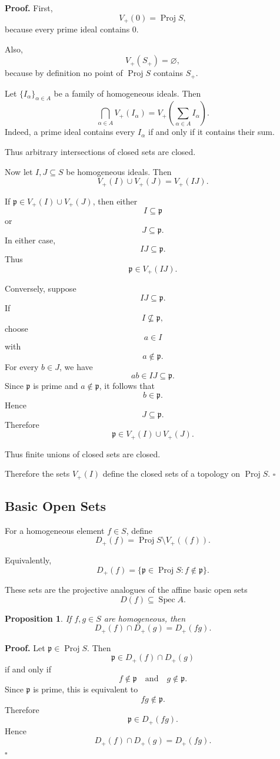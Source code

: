 \documentclass[12pt,a4paper]{article}
\DeclareMathOperator{\Spec}{Spec}
\DeclareMathOperator{\Proj}{Proj}
\newtheorem{proposition}[theorem]{Proposition}
\theoremstyle{notespace}
\begin{document}
\textbf{Proof.}
First,
\[
V_+(0)=\Proj S,
\]
because every prime ideal contains \(0\).

Also,
\[
V_+(S_+)=\varnothing,
\]
because by definition no point of \(\Proj S\) contains \(S_+\).

Let \(\{I_\alpha\}_{\alpha\in A}\) be a family of homogeneous ideals. Then
\[
\bigcap_{\alpha\in A}V_+(I_\alpha)
=
V_+\left(\sum_{\alpha\in A}I_\alpha\right).
\]
Indeed, a prime ideal contains every \(I_\alpha\) if and only if it contains their sum.

Thus arbitrary intersections of closed sets are closed.

Now let \(I,J\subseteq S\) be homogeneous ideals. Then
\[
V_+(I)\cup V_+(J)=V_+(IJ).
\]

If \(\mathfrak p\in V_+(I)\cup V_+(J)\), then either
\[
I\subseteq \mathfrak p
\]
or
\[
J\subseteq \mathfrak p.
\]
In either case,
\[
IJ\subseteq \mathfrak p.
\]
Thus
\[
\mathfrak p\in V_+(IJ).
\]

Conversely, suppose
\[
IJ\subseteq \mathfrak p.
\]
If
\[
I\not\subseteq \mathfrak p,
\]
choose
\[
a\in I
\]
with
\[
a\notin \mathfrak p.
\]
For every \(b\in J\), we have
\[
ab\in IJ\subseteq \mathfrak p.
\]
Since \(\mathfrak p\) is prime and \(a\notin \mathfrak p\), it follows that
\[
b\in \mathfrak p.
\]
Hence
\[
J\subseteq \mathfrak p.
\]
Therefore
\[
\mathfrak p\in V_+(I)\cup V_+(J).
\]

Thus finite unions of closed sets are closed.

Therefore the sets \(V_+(I)\) define the closed sets of a topology on \(\Proj S\).
\(\square\)

\subsection{Basic Open Sets}

For a homogeneous element \(f\in S\), define
\[
D_+(f)
=
\Proj S\setminus V_+((f)).
\]

Equivalently,
\[
D_+(f)
=
\{\mathfrak p\in \Proj S : f\notin \mathfrak p\}.
\]

These sets are the projective analogues of the affine basic open sets
\[
D(f)\subseteq \Spec A.
\]

\begin{proposition}
	If \(f,g\in S\) are homogeneous, then
	\[
	D_+(f)\cap D_+(g)=D_+(fg).
	\]
\end{proposition}

\textbf{Proof.}
Let \(\mathfrak p\in \Proj S\). Then
\[
\mathfrak p\in D_+(f)\cap D_+(g)
\]
if and only if
\[
f\notin\mathfrak p
\quad\text{and}\quad
g\notin\mathfrak p.
\]
Since \(\mathfrak p\) is prime, this is equivalent to
\[
fg\notin \mathfrak p.
\]
Therefore
\[
\mathfrak p\in D_+(fg).
\]
Hence
\[
D_+(f)\cap D_+(g)=D_+(fg).
\]
\(\square\)
\end{document}
